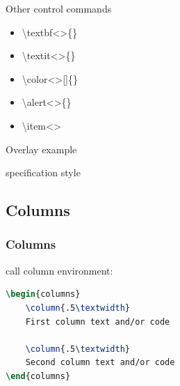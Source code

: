 \documentclass[11pt,pdf,aspectratio=43]{beamer}
\begin{document}
\begin{frame}{Other control commands}
    \begin{itemize}
	\item \textbackslash{}textbf\textless\textgreater\{\}
	\item \textbackslash{}textit\textless\textgreater\{\}
	\item \textbackslash{}color\textless\textgreater[]\{\}
	\item \textbackslash{}alert\textless\textgreater\{\}
	\item \textbackslash{}item\textless\textgreater
    \end{itemize}
\end{frame}
\begin{frame}{Overlay example}







     {specification style}
\end{frame}

\subsection*{Columns}
\begin{frame}[fragile, label=columns]
    \frametitle{Columns}
    call column environment: \\
    \begin{lstlisting}[language=TeX]
\begin{columns}
    \column{.5\textwidth}
	First column text and/or code

    \column{.5\textwidth}
	Second column text and/or code
\end{columns}
    \end{lstlisting}
\end{frame}

\end{document}
